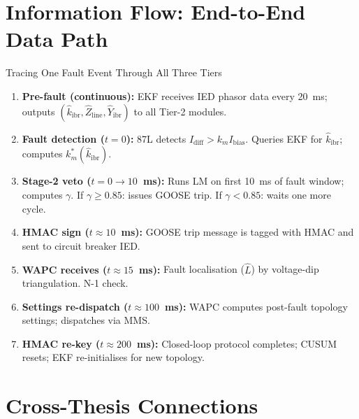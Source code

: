 \documentclass[12pt,a4paper]{article}
\newcommand{\kibrhat}{\hat{k}_\mathrm{ibr}}
\newcommand{\Zline}{\hat{Z}_\mathrm{line}}
\newcommand{\Yibr}{\hat{Y}_\mathrm{ibr}}
\newcommand{\Idiff}{I_\mathrm{diff}}
\newcommand{\Ibias}{I_\mathrm{bias}}
\newcommand{\km}{k_m}
\begin{document}
\section{Information Flow: End-to-End Data Path}

\begin{keybox}{Tracing One Fault Event Through All Three Tiers}
\begin{enumerate}[nosep]
  \item \textbf{Pre-fault (continuous):}  EKF receives IED phasor data
        every 20~ms; outputs $(\kibrhat, \Zline, \Yibr)$ to all Tier-2 modules.
  \item \textbf{Fault detection ($t = 0$):}  87L detects $\Idiff > \km\Ibias$.
        Queries EKF for $\kibrhat$; computes $\km^*(\kibrhat)$.
  \item \textbf{Stage-2 veto ($t = 0 \to 10$~ms):} Runs LM on first 10~ms
        of fault window; computes $\gamma$.  If $\gamma \geq 0.85$: issues
        GOOSE trip.  If $\gamma < 0.85$: waits one more cycle.
  \item \textbf{HMAC sign ($t \approx 10$~ms):} GOOSE trip message is
        tagged with HMAC and sent to circuit breaker IED.
  \item \textbf{WAPC receives ($t \approx 15$~ms):} Fault localisation
        ($\hat{L}$) by voltage-dip triangulation.  N-1 check.
  \item \textbf{Settings re-dispatch ($t \approx 100$~ms):} WAPC computes
        post-fault topology settings; dispatches via MMS.
  \item \textbf{HMAC re-key ($t \approx 200$~ms):} Closed-loop protocol
        completes; CUSUM resets; EKF re-initialises for new topology.
\end{enumerate}
\end{keybox}

\section{Cross-Thesis Connections}
\end{document}
